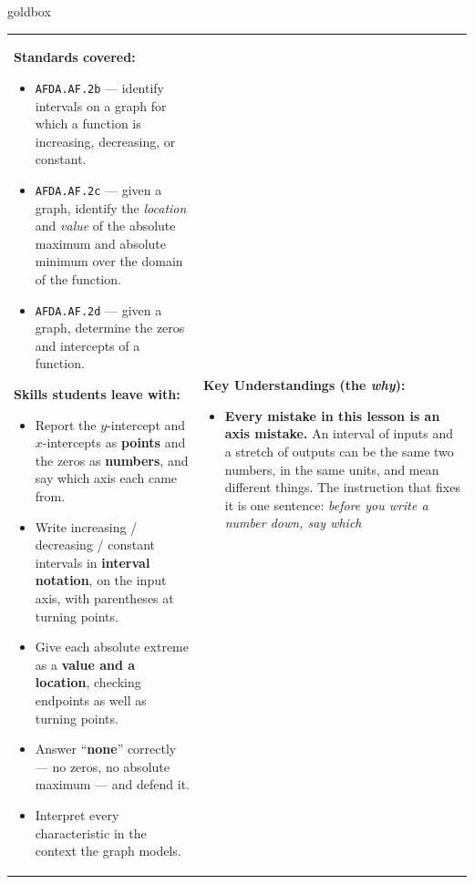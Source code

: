\documentclass[10pt]{article}
\begin{document}
\renewcommand{\arraystretch}{1.6}
\begin{skillbox}{goldbox}
\begin{tabularx}{\linewidth}{@{}X|X@{}}
\begin{minipage}[t]{\linewidth}\vspace{0pt}
\textbf{Standards covered:}
\begin{itemize}[leftmargin=1.1em, itemsep=2pt, topsep=2pt]
  \item \texttt{AFDA.AF.2b} --- identify intervals on a graph for which a function is increasing,
        decreasing, or constant.
  \item \texttt{AFDA.AF.2c} --- given a graph, identify the \emph{location} and \emph{value} of the
        absolute maximum and absolute minimum over the domain of the function.
  \item \texttt{AFDA.AF.2d} --- given a graph, determine the zeros and intercepts of a function.
\end{itemize}
\textbf{Skills students leave with:}
\begin{itemize}[leftmargin=1.1em, itemsep=2pt, topsep=2pt]
  \item Report the $y$-intercept and $x$-intercepts as \textbf{points} and the zeros as
        \textbf{numbers}, and say which axis each came from.
  \item Write increasing / decreasing / constant intervals in \textbf{interval notation}, on the
        input axis, with parentheses at turning points.
  \item Give each absolute extreme as a \textbf{value and a location}, checking endpoints as well as
        turning points.
  \item Answer ``\textbf{none}'' correctly --- no zeros, no absolute maximum --- and defend it.
  \item Interpret every characteristic in the context the graph models.
\end{itemize}
\end{minipage}
&
\begin{minipage}[t]{\linewidth}\vspace{0pt}
\textbf{Key Understandings (the \emph{why}):}
\begin{itemize}[leftmargin=1.1em, itemsep=2pt, topsep=2pt]
  \item \textbf{Every mistake in this lesson is an axis mistake.} An interval of inputs and a stretch
        of outputs can be the same two numbers, in the same units, and mean different things. The
        instruction that fixes it is one sentence: \emph{before you write a number down, say which
}
\end{itemize}
\end{minipage}
\end{tabularx}
\end{skillbox}
\end{document}
